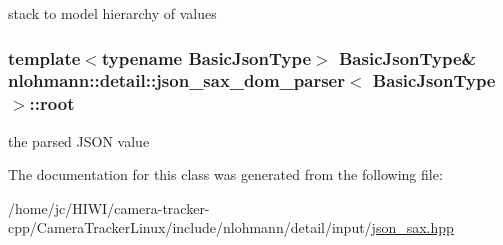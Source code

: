 stack to model hierarchy of values 

\subsubsection[{\texorpdfstring{root}{root}}]{\setlength{\rightskip}{0pt plus 5cm}template$<$typename Basic\+Json\+Type$>$ Basic\+Json\+Type\& {\bf nlohmann\+::detail\+::json\+\_\+sax\+\_\+dom\+\_\+parser}$<$ Basic\+Json\+Type $>$\+::root\hspace{0.3cm}{\ttfamily [private]}}\hypertarget{classnlohmann_1_1detail_1_1json__sax__dom__parser_aef0477277389e399d7128898841b71c0}{}\label{classnlohmann_1_1detail_1_1json__sax__dom__parser_aef0477277389e399d7128898841b71c0}


the parsed J\+S\+ON value 



The documentation for this class was generated from the following file\+:\begin{DoxyCompactItemize}
\item 
/home/jc/\+H\+I\+W\+I/camera-\/tracker-\/cpp/\+Camera\+Tracker\+Linux/include/nlohmann/detail/input/\hyperlink{json__sax_8hpp}{json\+\_\+sax.\+hpp}\end{DoxyCompactItemize}
